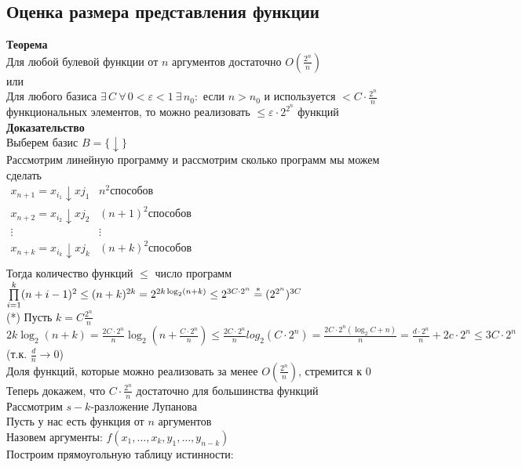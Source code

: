 \documentclass[12pt]{article}
\begin{document}
\subsection{Оценка размера представления функции}
\textbf{Теорема}\\
Для любой булевой функции от $n$ аргументов достаточно $O(\frac{2^n}n)$\\
или\\
Для любого базиса $\exists\,C\ \forall\,0 < \varepsilon < 1\ \exists\,n_0:$ если $n>n_0$ и используется $<C\cdot\frac {2^n}n$ функциональных элементов, то можно реализовать $\leq \varepsilon\cdot 2^{2^n}$ функций\\
\textbf{Доказательство}\\
Выберем базис $B=\{\downarrow\}$\\
Рассмотрим линейную программу и рассмотрим сколько программ мы можем сделать\\
$\begin{array}{cc}
    x_{n+1}=x_{i_1}\downarrow x{j_1} & n^2 \text{способов}\\
    x_{n+2}=x_{i_2}\downarrow x{j_2} & (n+1)^2 \text{способов}\\
    \vdots & \vdots\\
    x_{n+k}=x_{i_k}\downarrow x{j_k} & (n+k)^2 \text{способов}\\
\end{array}$\\
Тогда количество функций $\leq$ число программ $\prod\limits_{i=1}^k(n+i-1)^2 \leq (n+k)^{2k} = 2^{2k\log_2 (n+k)}\leq 2^{3C\cdot 2^n} \overset{*}{=} (2^{2^n})^{3C}$\\
(*) Пусть $k=C\frac{2^n}{n}$\\
$2k\log_2 (n+k) = \frac{2C\cdot 2^n}{n}\log_2(n+\frac{C\cdot 2^n}{n})\leq \frac{2C\cdot 2^n}{n}log_2(C\cdot 2^n)=\frac{2C\cdot 2^n(\log_2 C+n)}n = \frac{d\cdot 2^n}n+2c\cdot 2^n \leq 3C\cdot 2^n$\\(т.к. $\frac dn \rightarrow 0$)\\
Доля функций, которые можно реализовать за менее $O(\frac {2^n}n)$, стремится к 0\\
Теперь докажем, что $C\cdot \frac{2^n}n$ достаточно для большинства функций\\
Рассмотрим $s-k$-разложение Лупанова\\
Пусть у нас есть функция от $n$ аргументов\\
Назовем аргументы: $f(x_1,\ldots,x_k,y_1,\ldots,y_{n-k})$\\
Построим прямоугольную таблицу истинности:
\end{document}
